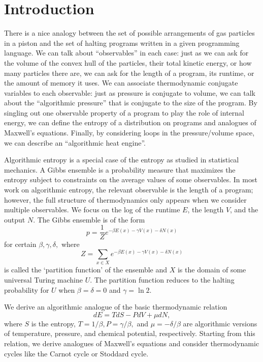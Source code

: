 \documentclass[12pt,twoside,openright]{report}
\begin{document}
  \tableofcontents
  \vfill
  \pagebreak

\renewcommand{\thepage}{\arabic{page}}
\setcounter{page}{1}
\chapter{Introduction}

There is a nice analogy between the set of possible arrangements of gas particles in a piston and the set of halting programs written in a given programming language.  We can talk about ``observables'' in each case: just as we can ask for the volume of the convex hull of the particles, their total kinetic energy, or how many particles there are, we can ask for the length of a program, its runtime, or the amount of memory it uses.  We can associate thermodynamic conjugate variables to each observable: just as pressure is conjugate to volume, we can talk about the ``algorithmic pressure'' that is conjugate to the size of the program.  By singling out one observable property of a program to play the role of internal energy, we can define the entropy of a distribution on programs and analogues of Maxwell's equations.  Finally, by considering loops in the pressure/volume space, we can describe an ``algorithmic heat engine''.

Algorithmic entropy is a special case of the entropy as studied in statistical mechanics.  A Gibbs ensemble is a probability measure that maximizes the entropy subject to constraints on the average values of some observables.  In most work on algorithmic entropy, the relevant observable is the length of a program; however, the full structure of thermodynamics only appears when we consider multiple observables.  We focus on the log of the runtime $E$, the length $V$, and the output $N$.  The Gibbs ensemble is of the form
\[ p = \frac{1}{Z} e^{-\beta E(x) - \gamma V(x) - \delta N(x)} \]
for certain $\beta, \gamma, \delta,$ where
\[ Z = \sum_{x \in X} e^{-\beta E(x) - \gamma V(x) - \delta N(x)} \]
is called the `partition function' of the ensemble and $X$ is the domain of some universal Turing machine $U$.  The partition function reduces to the halting probability for $U$ when $\beta = \delta = 0$ and $\gamma = \ln 2$.

We derive an algorithmic analogue of the basic thermodynamic relation
\[ dE = TdS - PdV + μdN, \]
where $S$ is the entropy, $T = 1/\beta, P = \gamma/\beta,$ and $\mu = -\delta/\beta$ are algorithmic versions of temperature, pressure, and chemical potential, respectively.  Starting from this relation, we derive analogues of Maxwell's equations and consider thermodynamic cycles like the Carnot cycle or Stoddard cycle.
\end{document}
